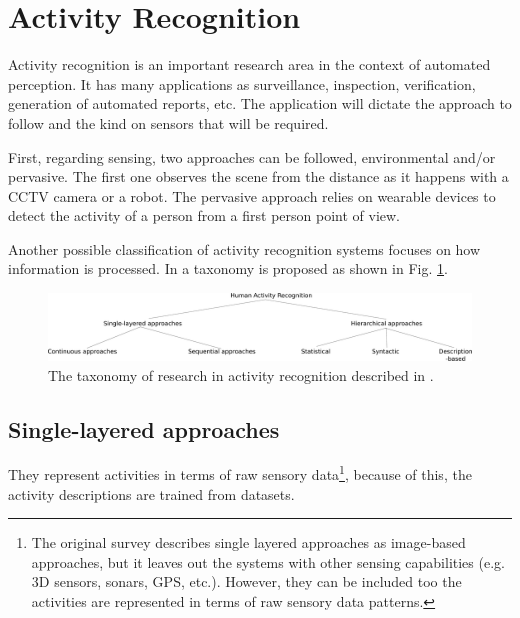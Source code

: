 \documentclass[a4paper, 12pt, openany, oneside]{book}
\begin{document}



\section{Activity Recognition} 

Activity recognition is an important research area in the context of automated perception. 
It has many applications as surveillance, inspection, verification, generation of automated reports, etc.
The application will dictate the approach to follow and the kind on sensors that will be required.

First, regarding sensing, two approaches can be followed, environmental and/or pervasive. 
The first one observes the scene from the distance as it happens with a CCTV camera or a robot. 
The pervasive approach relies on wearable devices to detect the activity of a person from a first person point of view.

Another possible classification of activity recognition systems focuses on how information is processed.
In \citep{Aggarwal11_HumanActivity} a taxonomy is proposed as shown in Fig. \ref{fig:taxonomy}.  

\begin{figure}[h]
\centering
\includegraphics[width=\textwidth]{fig/img_Aggarwal_Taxonomy2.pdf}
\caption{The taxonomy of research in activity recognition described in \cite{Aggarwal11_HumanActivity}.}
\label{fig:taxonomy}
\end{figure}

\subsection{Single-layered approaches}
They represent activities in terms of raw sensory data\footnote{The original survey \citep{Aggarwal11_HumanActivity} describes single layered approaches as image-based approaches, but it leaves out the systems with other sensing capabilities (e.g. 3D sensors, sonars, GPS, etc.).
However, they can be included too the activities are represented in terms of raw sensory data patterns.}, because of this, the activity descriptions are trained from datasets.
\end{document}

